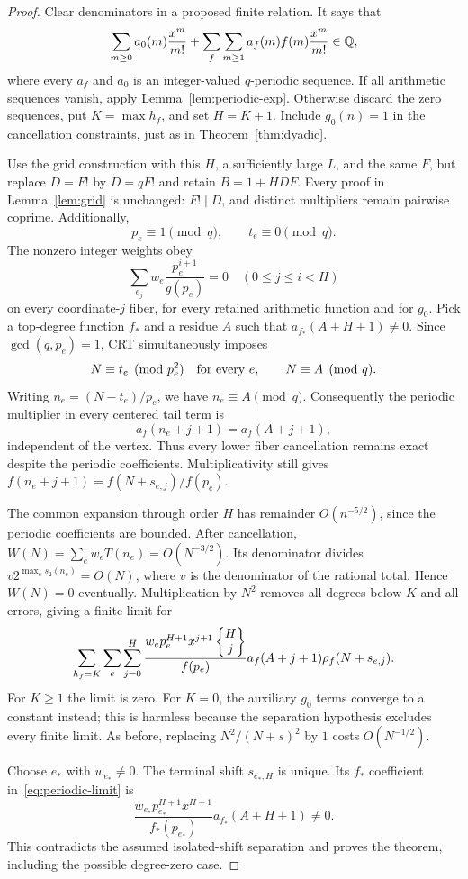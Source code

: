 \begin{proof}
Clear denominators in a proposed finite relation. It says that
\[
 \sum_{m\geq0}a_0(m)\frac{x^m}{m!}
 +\sum_f\sum_{m\geq1}a_f(m)f(m)\frac{x^m}{m!}\in\mathbb Q,
\]
where every $a_f$ and $a_0$ is an integer-valued $q$-periodic sequence.
If all arithmetic sequences vanish, apply
Lemma~\ref{lem:periodic-exp}. Otherwise discard the zero sequences,
put $K=\max h_f$, and set $H=K+1$. Include $g_0(n)=1$ in the
cancellation constraints, just as in Theorem~\ref{thm:dyadic}.

Use the grid construction with this $H$, a sufficiently large $L$,
and the same $F$, but replace $D=F!$ by $D=qF!$ and retain
$B=1+HDF$. Every proof in Lemma~\ref{lem:grid} is unchanged:
$F!\mid D$, and distinct multipliers remain pairwise coprime.
Additionally,
\[
 p_e\equiv1\pmod q,\qquad t_e\equiv0\pmod q.
\]
The nonzero integer weights obey
\[
 \sum_{e_j}w_e\frac{p_e^{i+1}}{g(p_e)}=0
 \quad(0\leq j\leq i<H)
\]
on every coordinate-$j$ fiber, for every retained arithmetic function
and for $g_0$. Pick a top-degree function $f_*$ and a residue $A$
such that $a_{f_*}(A+H+1)\ne0$.
Since $\gcd(q,p_e)=1$, CRT simultaneously imposes
\[
 N\equiv t_e\pmod{p_e^2}\quad\hbox{for every }e,
 \qquad N\equiv A\pmod q.
\]
Writing $n_e=(N-t_e)/p_e$, we have $n_e\equiv A\pmod q$.
Consequently the periodic multiplier in every centered tail term is
\[
 a_f(n_e+j+1)=a_f(A+j+1),
\]
independent of the vertex. Thus every lower fiber cancellation remains
exact despite the periodic coefficients. Multiplicativity still gives
$f(n_e+j+1)=f(N+s_{e,j})/f(p_e)$.

The common expansion through order $H$ has remainder $O(n^{-5/2})$,
since the periodic coefficients are bounded. After cancellation,
$W(N)=\sum_e w_e T(n_e)=O(N^{-3/2})$. Its denominator divides
$v2^{\max_e s_2(n_e)}=O(N)$, where $v$ is the denominator of the
rational total. Hence $W(N)=0$ eventually. Multiplication by $N^2$
removes all degrees below $K$ and all errors, giving a finite limit for
\begin{equation}\label{eq:periodic-limit}
 \sum_{h_f=K}\sum_e\sum_{j=0}^H
 \frac{w_ep_e^{H+1}x^{j+1}\left\{\begin{matrix}H\\j\end{matrix}\right\}}{f(p_e)}
     a_f(A+j+1)\rho_f(N+s_{e,j}).
\end{equation}
For $K\geq1$ the limit is zero. For $K=0$, the auxiliary $g_0$ terms
converge to a constant instead; this is harmless because the separation
hypothesis excludes every finite limit. As before, replacing
$N^2/(N+s)^2$ by $1$ costs $O(N^{-1/2})$.

Choose $e_*$ with $w_{e_*}\ne0$. The terminal shift $s_{e_*,H}$
is unique. Its $f_*$ coefficient in~\eqref{eq:periodic-limit} is
\[
 \frac{w_{e_*}p_{e_*}^{H+1}x^{H+1}}{f_*(p_{e_*})}
                 a_{f_*}(A+H+1)\ne0.
\]
This contradicts the assumed isolated-shift separation and proves the
theorem, including the possible degree-zero case.
\end{proof}

